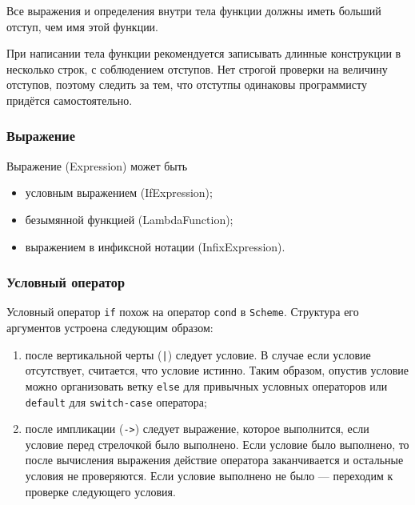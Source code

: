             Все выражения и определения внутри тела функции должны иметь больший отступ, чем имя этой функции.

            При написании тела функции рекомендуется записывать длинные конструкции в несколько строк, с соблюдением отступов.
            Нет строгой проверки на величину отступов, поэтому следить за тем, что отстутпы одинаковы программисту придётся самостоятельно.

            

        \subsubsection{Выражение}
            Выражение (Expression) может быть
            \begin{itemize}
                \item условным выражением (IfExpression);
                \item безымянной функцией (LambdaFunction);
                \item выражением в инфиксной нотации (InfixExpression).
            \end{itemize}

            

        \subsubsection{Условный оператор}
            Условный оператор \verb$if$ похож на оператор \verb$cond$ в \verb$Scheme$.
            Структура его аргументов устроена следующим образом:
            \begin{enumerate}
                \item после вертикальной черты (\verb,|,) следует условие.
                    В случае если условие отсутствует, считается, что условие истинно.
                    Таким образом, опустив условие можно организовать ветку \verb$else$ для привычных условных операторов
                    или \verb$default$ для \verb$switch-case$ оператора;
                \item после импликации (\verb,->,) следует выражение, которое выполнится, если условие перед стрелочкой было выполнено.
                    Если условие было выполнено, то после вычисления выражения действие оператора заканчивается и остальные условия не проверяются.
                    Если условие выполнено не было --- переходим к проверке следующего условия.
            \end{enumerate}

